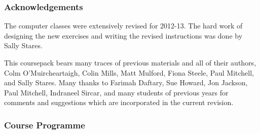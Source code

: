 \documentclass[11pt,a4paper,openany]{book}
\begin{document}
\subsubsection*{Acknowledgements}\label{acknowledgements}

The computer classes were extensively revised for 2012-13. The hard work
of designing the new exercises and writing the revised instructions was
done by Sally Stares.

This coursepack bears many traces of previous materials and all of their
authors, Colm O'Muircheartaigh, Colin Mills, Matt Mulford, Fiona Steele,
Paul Mitchell, and Sally Stares. Many thanks to Farimah Daftary, Sue
Howard, Jon Jackson, Paul Mitchell, Indraneel Sircar, and many students
of previous years for comments and suggestions which are incorporated in
the current revision.

\newpage

\subsubsection*{Course Programme}\label{course-programme}
\end{document}
